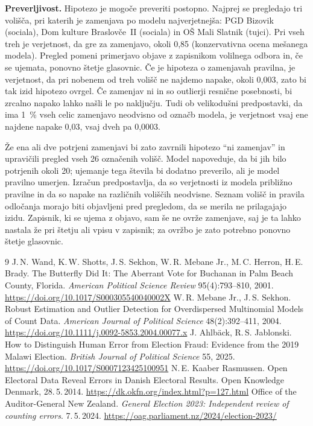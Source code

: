 \documentclass[11pt,a4paper]{article}
\begin{document}
\textbf{Preverljivost.} Hipotezo je mogoče preveriti postopno. Najprej se pregledajo tri volišča, pri katerih je zamenjava po modelu najverjetnejša: PGD Bizovik (sociala), Dom kulture Braslovče~II (sociala) in OŠ Mali Slatnik (tujci). Pri vseh treh je verjetnost, da gre za zamenjavo, okoli 0,85 (konzervativna ocena mešanega modela). Pregled pomeni primerjavo objave z zapisnikom volilnega odbora in, če se ujemata, ponovno štetje glasovnic. Če je hipoteza o zamenjavah pravilna, je verjetnost, da pri nobenem od treh volišč ne najdemo napake, okoli 0,003, zato bi tak izid hipotezo ovrgel. Če zamenjav ni in so outlierji resnične posebnosti, bi zrcalno napako lahko našli le po naključju. Tudi ob velikodušni predpostavki, da ima 1~\% vseh celic zamenjavo neodvisno od označb modela, je verjetnost vsaj ene najdene napake 0,03, vsaj dveh pa 0,0003.

Že ena ali dve potrjeni zamenjavi bi zato zavrnili hipotezo ``ni zamenjav'' in upravičili pregled vseh 26 označenih volišč. Model napoveduje, da bi jih bilo potrjenih okoli 20; ujemanje tega števila bi dodatno preverilo, ali je model pravilno umerjen. Izračun predpostavlja, da so verjetnosti iz modela približno pravilne in da so napake na različnih voliščih neodvisne. Seznam volišč in pravila odločanja morajo biti objavljeni pred pregledom, da se merila ne prilagajajo izidu. Zapisnik, ki se ujema z objavo, sam še ne ovrže zamenjave, saj je ta lahko nastala že pri štetju ali vpisu v zapisnik; za ovržbo je zato potrebno ponovno štetje glasovnic.

\clearpage
{}
\begin{thebibliography}{9}
 J.\,N. Wand, K.\,W. Shotts, J.\,S. Sekhon, W.\,R. Mebane Jr., M.\,C. Herron, H.\,E. Brady. The Butterfly Did It: The Aberrant Vote for Buchanan in Palm Beach County, Florida. \emph{American Political Science Review} 95(4):793--810, 2001. \url{https://doi.org/10.1017/S000305540040002X}
 W.\,R. Mebane Jr., J.\,S. Sekhon. Robust Estimation and Outlier Detection for Overdispersed Multinomial Models of Count Data. \emph{American Journal of Political Science} 48(2):392--411, 2004. \url{https://doi.org/10.1111/j.0092-5853.2004.00077.x}
 J. Ahlbäck, R.\,S. Jablonski. How to Distinguish Human Error from Election Fraud: Evidence from the 2019 Malawi Election. \emph{British Journal of Political Science} 55, 2025. \url{https://doi.org/10.1017/S0007123425100951}
 N.\,E. Kaaber Rasmussen. Open Electoral Data Reveal Errors in Danish Electoral Results. Open Knowledge Denmark, 28.\,5.\,2014. \url{https://dk.okfn.org/index.html?p=127.html}
 Office of the Auditor-General New Zealand. \emph{General Election 2023: Independent review of counting errors}. 7.\,5.\,2024. \url{https://oag.parliament.nz/2024/election-2023/}
\end{thebibliography}
\end{document}

